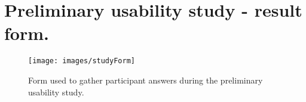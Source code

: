 \chapter{Preliminary usability study - result form.}
\label{app:studyForm}

\begin{figure}[htb]
  \centering
    \texttt{[image: images/studyForm]}
  \caption{Form used to gather participant answers during the preliminary usability study.}
  \label{studyScreenshot}
\end{figure}
